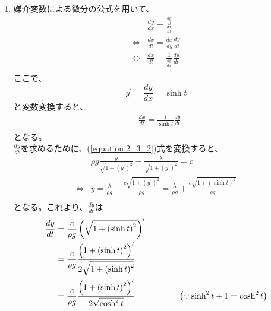 \begin{enumerate}
  \item 媒介変数による微分の公式を用いて、
  \begin{equation}\label{equation:2_4_a_1}
    \begin{split}
      & \frac{dy}{dx} = \frac{\frac{dy}{dt}}{\frac{dx}{dt}} \\
      \Leftrightarrow & \frac{dx}{dt} = \frac{dx}{dy} \frac{dy}{dt} \\
      \Leftrightarrow & \frac{dx}{dt} = \frac{1}{\frac{dy}{dx}} \frac{dy}{dt} \\
    \end{split}
  \end{equation}
  ここで、
  \begin{equation}\label{equation:2_4_a_2}
    y^{\prime} = \frac{dy}{dx} = \sinh t
  \end{equation}
  と変数変換すると、
  \begin{equation}\label{equation:2_4_a_3}
    \begin{split}
      & \frac{dx}{dt} = \frac{1}{\sinh t} \frac{dy}{dt} \\
    \end{split}
  \end{equation}
  となる。\\
  \(\frac{dy}{dt}\)を求めるために、(\ref{equation:2_3_2})式を変換すると、
  \begin{equation}\label{equation:2_4_a_4}
    \begin{split}
      & \rho g \frac{y}{\sqrt{1 + \left(y^{\prime}\right)^2}} - \frac{\lambda}{\sqrt{1 + \left(y^{\prime}\right)^2}} = c \\
      \Leftrightarrow & y = \frac{\lambda}{\rho g} + \frac{c \sqrt{1 + \left(y^{\prime}\right)^2}}{\rho g} = \frac{\lambda}{\rho g} + \frac{c \sqrt{1 + \left(\sinh t\right)^2}}{\rho g}\\
    \end{split}
  \end{equation}
  となる。これより、\(\frac{dy}{dt}\)は
  \begin{alignat}{2}\label{equation:2_4_a_5}
    \frac{dy}{dt} &= \frac{c}{\rho g} \left(\sqrt{1 + \left(\sinh{t} \right)^2}\right)^{\prime} & \quad \quad \quad & \notag\\
    &= \frac{c}{\rho g} \frac{\left(1 + \left(\sinh{t} \right)^2\right)^{\prime}}{2\sqrt{1 + \left(\sinh{t} \right)^2}} & & \notag\\
    &= \frac{c}{\rho g} \frac{\left(1 + \left(\sinh{t} \right)^2\right)^{\prime}}{2 \sqrt{\cosh^{2}{t}}} & & \left(\because \sinh^{2}{t} + 1 = \cosh^{2}{t}\right) \notag\\

\end{alignat}
\end{enumerate}
